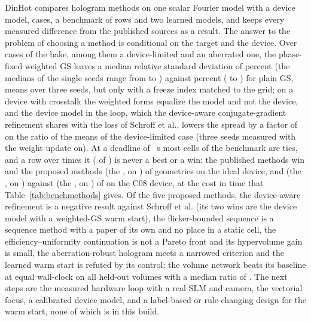 DinHot compares \nLadder{} hologram methods on one scalar Fourier model with a device model, \nCases{} cases, a benchmark of \benchRows{} rows and two learned models, and keeps every measured difference from the published sources as a result. The answer to the problem of choosing a method is conditional on the target and the device. Over \hlN{} cases of the bake, among them a device-limited and an aberrated one, the phase-fixed weighted GS leaves a median relative standard deviation of \hlSigmaMseven{} percent (the medians of the single seeds range from \hlSigmaMsevenLo{} to \hlSigmaMsevenHi{}) against \hlSigmaMfour{} percent (\hlSigmaMfourLo{} to \hlSigmaMfourHi{}) for plain GS, means over three seeds, but only with a freeze index matched to the grid; on a device with crosstalk the weighted forms equalize the model and not the device, and the device model in the loop, which the device-aware conjugate-gradient refinement shares with the loss of Schroff et al., lowers the spread by a factor of \bakeCeightRatioThree{} on the ratio of the means of the device-limited case (three seeds measured with the weight update on). At a deadline of \dlReadS{}~s most cells of the benchmark are ties, and a row over \dlFactor{} times it (\dlOverRead{} of \dlRowsRead{}) is never a best or a win: the published methods win \benchWinsIdealPublished{} and the proposed methods \benchWinsIdealProposed{} (the \dlWinIdealProposedMethods{}, on \dlWinIdealProposedCells{}) of \benchGeoIdeal{} geometries on the ideal device, and \benchWinsDevicePublished{} (the \dlWinDevicePublishedMethods{}, on \dlWinDevicePublishedCells{}) against \benchWinsDeviceProposed{} (the \dlWinDeviceProposedMethods{}, on \dlWinDeviceProposedCells{}) of \benchGeoDevice{} on the C08 device, at the cost in time that Table~\ref{tab:benchmethods} gives. Of the five proposed methods, the device-aware refinement is a negative result against Schroff et al. (its two wins are the device model with a weighted-GS warm start), the flicker-bounded sequence is a sequence method with a paper of its own and no place in a static cell, the efficiency--uniformity continuation is not a Pareto front and its hypervolume gain is small, the aberration-robust hologram meets a narrowed criterion and the learned warm start is refuted by its control; the volume network beats its baseline at equal wall-clock on all \cghN{} held-out volumes with a median ratio of \cghMed{}. The next steps are the measured hardware loop with a real SLM and camera, the vectorial focus, a calibrated device model, and a label-based or rule-changing design for the warm start, none of which is in this build.


